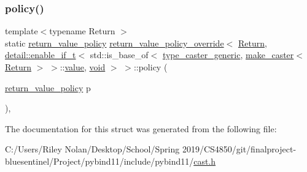 \subsubsection{\texorpdfstring{policy()}{policy()}}
{\footnotesize\ttfamily template$<$typename Return $>$ \\
static \mbox{\hyperlink{detail_2common_8h_adde72ab1fb0dd4b48a5232c349a53841}{return\+\_\+value\+\_\+policy}} \mbox{\hyperlink{structreturn__value__policy__override}{return\+\_\+value\+\_\+policy\+\_\+override}}$<$ \mbox{\hyperlink{_python-ast_8h_abdae7f49d66ce8e500825bb53aa14901}{Return}}, \mbox{\hyperlink{detail_2common_8h_a012819c9e8b5e04872a271f50f8b8196}{detail\+::enable\+\_\+if\+\_\+t}}$<$ std\+::is\+\_\+base\+\_\+of$<$ \mbox{\hyperlink{classtype__caster__generic}{type\+\_\+caster\+\_\+generic}}, \mbox{\hyperlink{cast_8h_ab32b52411a6b07420516d79074815713}{make\+\_\+caster}}$<$ \mbox{\hyperlink{_python-ast_8h_abdae7f49d66ce8e500825bb53aa14901}{Return}} $>$ $>$\+::\mbox{\hyperlink{_s_d_l__opengl__glext_8h_a8ad81492d410ff2ac11f754f4042150f}{value}}, \mbox{\hyperlink{_s_d_l__opengles2__gl2ext_8h_ae5d8fa23ad07c48bb609509eae494c95}{void}} $>$ $>$\+::policy (\begin{DoxyParamCaption}\item[{\mbox{\hyperlink{detail_2common_8h_adde72ab1fb0dd4b48a5232c349a53841}{return\+\_\+value\+\_\+policy}}}]{p }\end{DoxyParamCaption})\hspace{0.3cm}{\ttfamily [inline]}, {\ttfamily [static]}}



The documentation for this struct was generated from the following file\+:\begin{DoxyCompactItemize}
\item 
C\+:/\+Users/\+Riley Nolan/\+Desktop/\+School/\+Spring 2019/\+C\+S4850/git/finalproject-\/bluesentinel/\+Project/pybind11/include/pybind11/\mbox{\hyperlink{cast_8h}{cast.\+h}}\end{DoxyCompactItemize}

